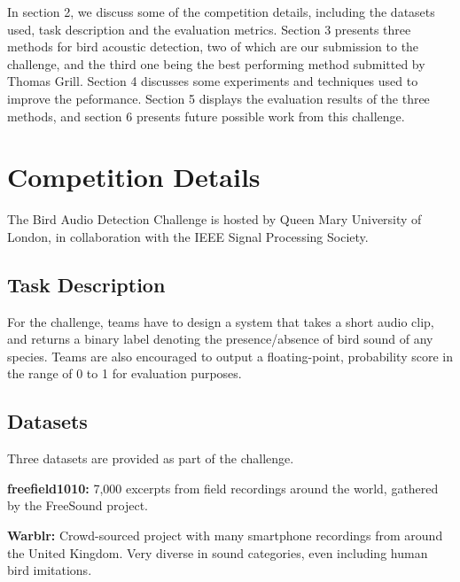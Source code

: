 \documentclass[10pt,twocolumn,letterpaper]{article}
\begin{document}
In section 2, we discuss some of the competition details, including the
datasets used, task description and the evaluation metrics. Section 3
presents three methods for bird acoustic detection, two of which are our
submission to the challenge, and the third one being the best performing
method submitted by Thomas Grill. Section 4 discusses some experiments and
techniques used to improve the peformance. Section 5 displays the
evaluation results of the three methods, and section 6 presents future
possible work from this challenge.

\section{Competition Details}

The Bird Audio Detection Challenge is hosted by Queen Mary University of
London, in collaboration with the IEEE Signal Processing Society.

\subsection{Task Description}

For the challenge, teams have to design a system that takes a short audio
clip, and returns a binary label denoting the presence/absence of bird
sound of any species. Teams are also encouraged to output a floating-point,
probability score in the range of 0 to 1 for evaluation purposes.

\subsection{Datasets}

Three datasets are provided as part of the challenge.


\textbf{freefield1010:} 7,000 excerpts from field recordings around the
world, gathered by the FreeSound project.

\textbf{Warblr:} Crowd-sourced project with many smartphone recordings from
around the United Kingdom. Very diverse in sound categories, even including
human bird imitations.

\end{document}
